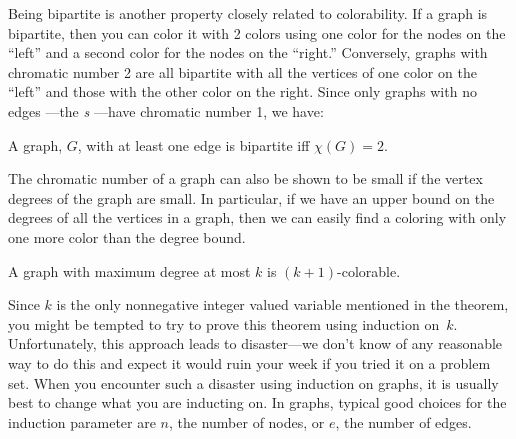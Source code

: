 Being bipartite is another property closely related to colorability.  If a
graph is bipartite, then you can color it with 2 colors using one color
for the nodes on the ``left'' and a second color for the nodes on the
``right.''  Conversely, graphs with chromatic number 2 are all bipartite
with all the vertices of one color on the ``left'' and those with the
other color on the right.  Since only graphs with no edges ---the
\emph{s} ---have chromatic number 1, we have:  \iffalse
Empty graphs are
bipartite as long they have at least two vertices: a graph with only one
vertex is not bipartite because its vertex set cannot be partitioned into
two \emph{nonempty} subsets.\fi
\begin{lemma}\label{2color-iff-bip}
A graph, $G$, with at least one edge is bipartite iff $\chi(G) = 2$.
\end{lemma}

The chromatic number of a graph can also be shown to be small if the
vertex degrees of the graph are small.  In particular, if we have an
upper bound on the degrees of all the vertices in a graph, then we can
easily find a coloring with only one more color than the degree bound.

\begin{theorem}\label{thm:k+1-colorable}
A graph with maximum degree at most $k$ is $(k+1)$-colorable.
\end{theorem}

Since $k$ is the only nonnegative integer valued variable mentioned in the
theorem, you might be tempted to try to prove this theorem using induction
on~$k$.  Unfortunately, this approach leads to disaster---we don't know of
any reasonable way to do this and expect it would ruin your week if you
tried it on a problem set.  When you encounter such a disaster using
induction on graphs, it is usually best to change what you are inducting
on.  In graphs, typical good choices for the induction parameter are $n$,
the number of nodes, or $e$, the number of edges.

